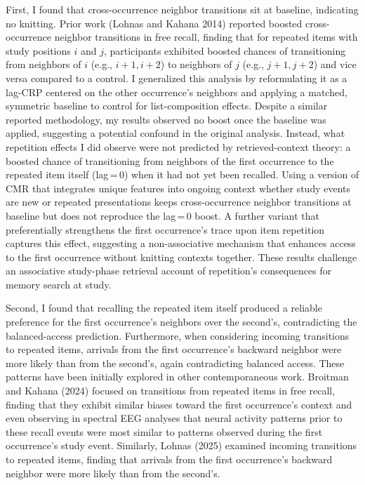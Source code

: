 \documentclass[
  letterpaper,
  11pt,
  english,
  singlespacing,
  headsepline]{MastersDoctoralThesis}
\begin{document}
First, I found that cross-occurrence neighbor transitions sit at
baseline, indicating no knitting. Prior work (Lohnas and Kahana 2014)
reported boosted cross-occurrence neighbor transitions in free recall,
finding that for repeated items with study positions \(i\) and \(j\),
participants exhibited boosted chances of transitioning from neighbors
of \(i\) (e.g., \(i{+}1,i{+}2\)) to neighbors of \(j\) (e.g.,
\(j{+}1,j{+}2\)) and vice versa compared to a control. I generalized
this analysis by reformulating it as a lag-CRP centered on the other
occurrence's neighbors and applying a matched, symmetric baseline to
control for list-composition effects. Despite a similar reported
methodology, my results observed no boost once the baseline was applied,
suggesting a potential confound in the original analysis. Instead, what
repetition effects I did observe were not predicted by retrieved-context
theory: a boosted chance of transitioning from neighbors of the first
occurrence to the repeated item itself (lag\,=\,0) when it had not yet
been recalled. Using a version of CMR that integrates unique features
into ongoing context whether study events are new or repeated
presentations keeps cross-occurrence neighbor transitions at baseline
but does not reproduce the lag\,=\,0 boost. A further variant that
preferentially strengthens the first occurrence's trace upon item
repetition captures this effect, suggesting a non-associative mechanism
that enhances access to the first occurrence without knitting contexts
together. These results challenge an associative study-phase retrieval
account of repetition's consequences for memory search at study.

Second, I found that recalling the repeated item itself produced a
reliable preference for the first occurrence's neighbors over the
second's, contradicting the balanced-access prediction. Furthermore,
when considering incoming transitions to repeated items, arrivals from
the first occurrence's backward neighbor were more likely than from the
second's, again contradicting balanced access. These patterns have been
initially explored in other contemporaneous work. Broitman and Kahana
(2024) focused on transitions from repeated items in free recall,
finding that they exhibit similar biases toward the first occurrence's
context and even observing in spectral EEG analyses that neural activity
patterns prior to these recall events were most similar to patterns
observed during the first occurrence's study event. Similarly, Lohnas
(2025) examined incoming transitions to repeated items, finding that
arrivals from the first occurrence's backward neighbor were more likely
than from the second's.
\end{document}
